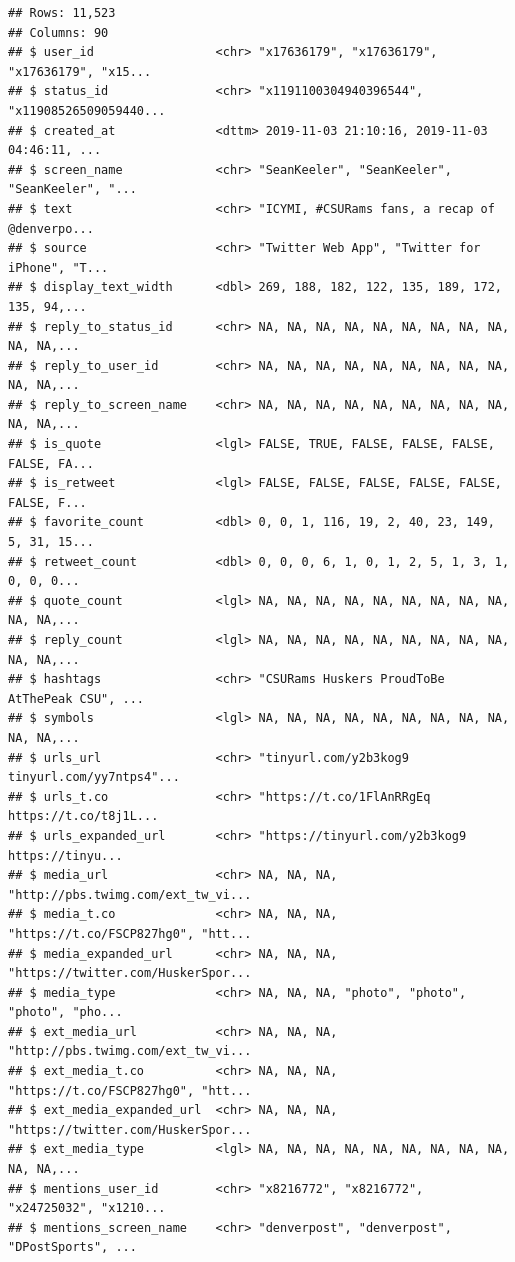 \documentclass[
]{book}
\begin{document}
\begin{verbatim}
## Rows: 11,523
## Columns: 90
## $ user_id                 <chr> "x17636179", "x17636179", "x17636179", "x15...
## $ status_id               <chr> "x1191100304940396544", "x11908526509059440...
## $ created_at              <dttm> 2019-11-03 21:10:16, 2019-11-03 04:46:11, ...
## $ screen_name             <chr> "SeanKeeler", "SeanKeeler", "SeanKeeler", "...
## $ text                    <chr> "ICYMI, #CSURams fans, a recap of @denverpo...
## $ source                  <chr> "Twitter Web App", "Twitter for iPhone", "T...
## $ display_text_width      <dbl> 269, 188, 182, 122, 135, 189, 172, 135, 94,...
## $ reply_to_status_id      <chr> NA, NA, NA, NA, NA, NA, NA, NA, NA, NA, NA,...
## $ reply_to_user_id        <chr> NA, NA, NA, NA, NA, NA, NA, NA, NA, NA, NA,...
## $ reply_to_screen_name    <chr> NA, NA, NA, NA, NA, NA, NA, NA, NA, NA, NA,...
## $ is_quote                <lgl> FALSE, TRUE, FALSE, FALSE, FALSE, FALSE, FA...
## $ is_retweet              <lgl> FALSE, FALSE, FALSE, FALSE, FALSE, FALSE, F...
## $ favorite_count          <dbl> 0, 0, 1, 116, 19, 2, 40, 23, 149, 5, 31, 15...
## $ retweet_count           <dbl> 0, 0, 0, 6, 1, 0, 1, 2, 5, 1, 3, 1, 0, 0, 0...
## $ quote_count             <lgl> NA, NA, NA, NA, NA, NA, NA, NA, NA, NA, NA,...
## $ reply_count             <lgl> NA, NA, NA, NA, NA, NA, NA, NA, NA, NA, NA,...
## $ hashtags                <chr> "CSURams Huskers ProudToBe AtThePeak CSU", ...
## $ symbols                 <lgl> NA, NA, NA, NA, NA, NA, NA, NA, NA, NA, NA,...
## $ urls_url                <chr> "tinyurl.com/y2b3kog9 tinyurl.com/yy7ntps4"...
## $ urls_t.co               <chr> "https://t.co/1FlAnRRgEq https://t.co/t8j1L...
## $ urls_expanded_url       <chr> "https://tinyurl.com/y2b3kog9 https://tinyu...
## $ media_url               <chr> NA, NA, NA, "http://pbs.twimg.com/ext_tw_vi...
## $ media_t.co              <chr> NA, NA, NA, "https://t.co/FSCP827hg0", "htt...
## $ media_expanded_url      <chr> NA, NA, NA, "https://twitter.com/HuskerSpor...
## $ media_type              <chr> NA, NA, NA, "photo", "photo", "photo", "pho...
## $ ext_media_url           <chr> NA, NA, NA, "http://pbs.twimg.com/ext_tw_vi...
## $ ext_media_t.co          <chr> NA, NA, NA, "https://t.co/FSCP827hg0", "htt...
## $ ext_media_expanded_url  <chr> NA, NA, NA, "https://twitter.com/HuskerSpor...
## $ ext_media_type          <lgl> NA, NA, NA, NA, NA, NA, NA, NA, NA, NA, NA,...
## $ mentions_user_id        <chr> "x8216772", "x8216772", "x24725032", "x1210...
## $ mentions_screen_name    <chr> "denverpost", "denverpost", "DPostSports", ...

\end{verbatim}
\end{document}
